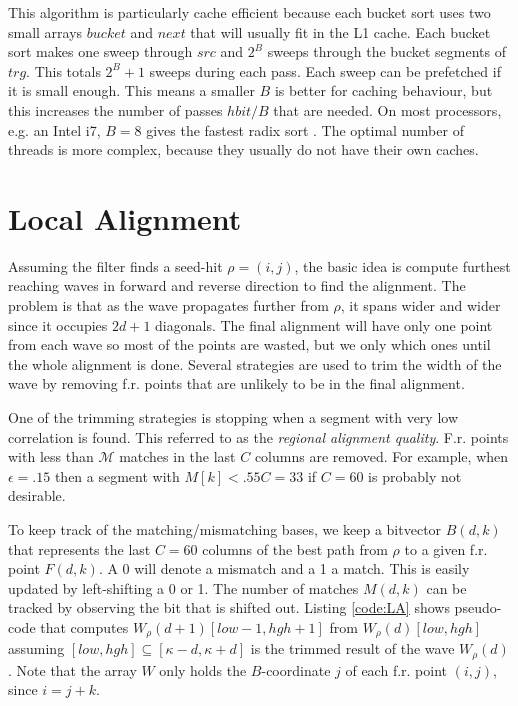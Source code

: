 \documentclass[../main/thesis.tex]{subfiles}
\begin{document}


This algorithm is particularly cache efficient because each bucket sort uses two small arrays $bucket$ and $next$ that will usually fit in the L1 cache.
Each bucket sort makes one sweep through $src$ and $2^B$ sweeps through the bucket segments of $trg$.
This totals $2^B+1$ sweeps during each pass.
Each sweep can be prefetched if it is small enough.
This means a smaller $B$ is better for caching behaviour, but this increases the number of passes $hbit/B$ that are needed.
On most processors, e.g. an Intel i7, $B = 8$ gives the fastest radix sort \cite{daligner}.
The optimal number of threads is more complex, because they usually do not have their own caches.



\section{Local Alignment}
Assuming the filter finds a seed-hit $\rho = (i,j)$, the basic idea is compute furthest reaching waves in forward and reverse direction to find the alignment.
The problem is that as the wave propagates further from $\rho$, it spans wider and wider since it occupies $2d+1$ diagonals.
The final alignment will have only one point from each wave so most of the points are wasted, but we only which ones until the whole alignment is done.
Several strategies are used to trim the width of the wave by removing f.r. points that are unlikely to be in the final alignment.

One of the trimming strategies is stopping when a segment with very low correlation is found.
This referred to as the \textit{regional alignment quality}.
F.r. points with less than $\mathcal{M}$ matches in the last $C$ columns are removed.
For example, when $\epsilon = .15$ then a segment with $M[k] < .55C = 33$ if $C = 60$ is probably not desirable.

To keep track of the matching/mismatching bases, we keep a bitvector $B(d,k)$ that represents the last $C = 60$ columns of the best path from $\rho$ to a given f.r. point $F(d,k)$.
A 0 will denote a mismatch and a 1 a match.
This is easily updated by left-shifting a 0 or 1.
The number of matches $M(d,k)$ can be tracked by observing the bit that is shifted out.
Listing \ref{code:LA} shows pseudo-code that computes $W_\rho(d+1)[low-1,hgh+1]$ from $W_\rho(d)[low,hgh]$ assuming $[low,hgh] \subseteq [\kappa-d,\kappa+d]$ is the trimmed result of the wave $W_\rho(d)$.
Note that the array $W$ only holds the $B$-coordinate $j$ of each f.r. point $(i,j)$, since $i = j + k$.
\end{document}
